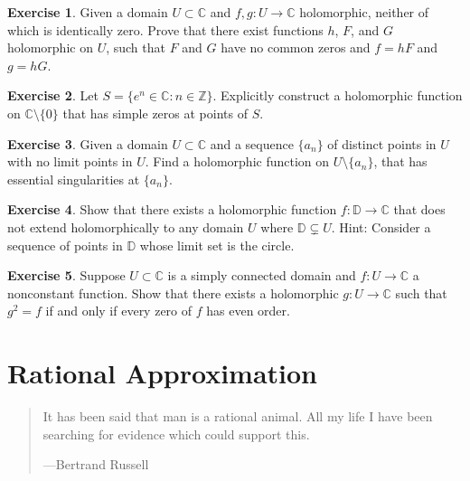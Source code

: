 \documentclass[12pt,openany]{book}
\newcommand{\C}{{\mathbb{C}}}
\newcommand{\Z}{{\mathbb{Z}}}
\newcommand{\D}{{\mathbb{D}}}
\theoremstyle{plain}
\theoremstyle{remark}
\theoremstyle{definition}
\newenvironment{exbox}{%
    \def\FrameCommand{\vrule width 1pt \relax\hspace{10pt}}%
    \MakeFramed{\advance\hsize-\width\FrameRestore}%
}{%
    \endMakeFramed
}
\newenvironment{myepigraph}{%
    \begin{quote}%
    \begingroup\itshape
}{%
    \endgroup%
    \end{quote}
}
\theoremstyle{exercise}
\newtheorem{exercise}{Exercise}[section]
\theoremstyle{example}
\begin{document}
\begin{exbox}
\begin{exercise}
Given a domain $U \subset \C$ and $f,g \colon U \to \C$ holomorphic, neither of
which is identically zero.  Prove that there exist functions $h$, $F$,
and $G$ holomorphic on $U$, such that $F$ and $G$ have no common zeros and
$f=hF$ and $g=hG$.
\end{exercise}

\begin{exercise}
Let $S = \bigl\{ e^n \in \C : n \in \Z \bigr\}$.
Explicitly construct a holomorphic function on $\C \setminus \{ 0 \}$
that has simple zeros at
points of $S$.
\end{exercise}

\begin{exercise}
Given a domain $U \subset \C$ and a sequence $\{ a_n \}$ of distinct points in $U$
with no limit points in $U$.  Find a holomorphic function on
$U \setminus \{ a_n \}$, that has essential
singularities at $\{ a_n \}$.
\end{exercise}

\begin{exercise}
Show that there exists a holomorphic function $f \colon \D \to \C$ that does
not extend holomorphically to any domain $U$ where $\D \subsetneq U$.  Hint:
Consider a sequence of points in $\D$ whose limit set is the circle.
\end{exercise}

\begin{exercise}
Suppose $U \subset \C$ is a simply connected domain and $f \colon U \to \C$
a nonconstant function.  Show that there exists a holomorphic $g \colon U
\to \C$ such that $g^2 = f$ if and only if every zero of $f$ has even order.
\end{exercise}
\end{exbox}


\chapter{Rational Approximation} \label{ch:runge}

\begin{myepigraph}
It has been said that man is a rational animal. All my life I have been searching for evidence which could support this.

---Bertrand Russell
\end{myepigraph}
\end{document}
